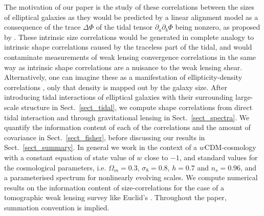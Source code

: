 \documentclass[a4paper,fleqn,usenatbib]{mnras}
\begin{document}
The motivation of our paper is the study of these correlations between the sizes of elliptical galaxies as they would be predicted by a linear alignment model as a consequence of the trace $\Delta\Phi$ of the tidal tensor $\partial_a\partial_b\Phi$ being nonzero, as proposed by \citet{hirata_galaxy-galaxy_2004, hirata_intrinsic_2010}. These intrinsic size correlations would be generated in complete analogy to intrinsic shape correlations caused by the traceless part of the tidal, and would contaminate measurements of weak lensing convergence correlations \cite{alsing_weak_2014} in the same way as intrinsic shape correlations are a nuisance to the weak lensing shear. Alternatively, one can imagine these as a manifestation of ellipticity-density correlations \cite{hui_intrinsic/extrinsic_2002}, only that density is mapped out by the galaxy size. After introducing tidal interactions of elliptical galaxies with their surrounding large-scale structure in Sect.~\ref{sect_tidal}, we compute shape correlations from direct tidal interaction and through gravitational lensing in Sect.~\ref{sect_spectra}. We quantify the information content of each of the correlations and the amount of covariance in Sect.~\ref{sect_fisher}, before discussing our results in Sect.~\ref{sect_summary}. In general we work in the context of a $w$CDM-cosmology with a constant equation of state value of $w$ close to $-1$, and standard values for the cosmological parameters, i.e. $\Omega_m = 0.3$, $\sigma_8 =  0.8$, $h = 0.7$ and $n_s = 0.96$, and a parameterised spectrum for nonlinearly evolving scales. We compute numerical results on the information content of size-correlations for the case of a tomographic weak lensing survey like Euclid's \cite{Amendola:2016saw}. Throughout the paper, summation convention is implied.


\end{document}
